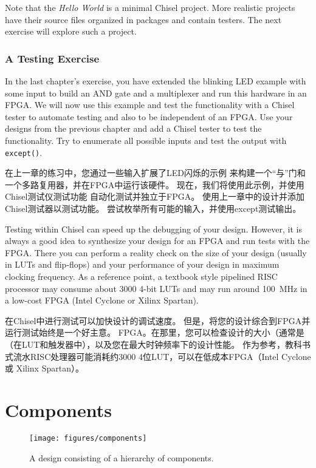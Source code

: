 \documentclass[%
    10pt,
    headinclude, footexclude,
    openright, %
    notitlepage,
    cleardoubleempty,
    headsepline,
    pointlessnumbers,
    bibtotoc, idxtotoc,
    ]{scrbook}
\newcommand{\code}[1]{{\small{\texttt{#1}}}}
\newcommand{\scale}{0.7}
\begin{document}
Note that the \emph{Hello World} is a minimal Chisel project.
More realistic projects have their source files organized in packages and contain testers.
The next exercise will explore such a project.

\subsection{A Testing Exercise}

In the last chapter's exercise, you have extended the blinking LED example with some input
to build an AND gate and a multiplexer and run this hardware in an FPGA.
We will now use this example and test the functionality with a Chisel tester
to automate testing and also to be independent of an FPGA.
Use your designs from the previous chapter and add a Chisel tester to test the functionality.
Try to enumerate all possible inputs and test the output with \code{except()}.

在上一章的练习中，您通过一些输入扩展了LED闪烁的示例
来构建一个“与”门和一个多路复用器，并在FPGA中运行该硬件。
现在，我们将使用此示例，并使用Chisel测试仪测试功能
自动化测试并独立于FPGA。
使用上一章中的设计并添加Chisel测试器以测试功能。
尝试枚举所有可能的输入，并使用except测试输出。

Testing within Chisel can speed up the debugging of your design.
However, it is always a good idea to synthesize your design for an FPGA and run tests
with the FPGA. There you can perform a reality check on the size of your design (usually
in LUTs and flip-flops) and your performance of your design in maximum clocking frequency.
As a reference point, a textbook style pipelined RISC processor may consume about 3000
4-bit LUTs and may run around 100~MHz in a low-cost FPGA (Intel Cyclone or
Xilinx Spartan).


在Chisel中进行测试可以加快设计的调试速度。
但是，将您的设计综合到FPGA并运行测试始终是一个好主意。
FPGA。在那里，您可以检查设计的大小（通常是
（在LUT和触发器中），以及您在最大时钟频率下的设计性能。
作为参考，教科书式流水RISC处理器可能消耗约3000
4位LUT，可以在低成本FPGA（Intel Cyclone或
Xilinx Spartan）。


\chapter{Components}

\begin{figure}
  \centering
  \texttt{[image: figures/components]}
  \caption{A design consisting of a hierarchy of components.}
  \label{fig:components}
\end{figure}
\end{document}
